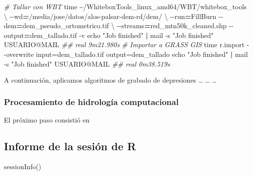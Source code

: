 \documentclass[spanish]{article}
\newenvironment{Shaded}{\begin{snugshade}}{\end{snugshade}}
\newcommand{\AttributeTok}[1]{\textcolor[rgb]{0.77,0.63,0.00}{#1}}
\newcommand{\BuiltInTok}[1]{#1}
\newcommand{\CommentTok}[1]{\textcolor[rgb]{0.56,0.35,0.01}{\textit{#1}}}
\newcommand{\DataTypeTok}[1]{\textcolor[rgb]{0.13,0.29,0.53}{#1}}
\newcommand{\ExtensionTok}[1]{#1}
\newcommand{\FunctionTok}[1]{\textcolor[rgb]{0.00,0.00,0.00}{#1}}
\newcommand{\KeywordTok}[1]{\textcolor[rgb]{0.13,0.29,0.53}{\textbf{#1}}}
\newcommand{\NormalTok}[1]{#1}
\newcommand{\OperatorTok}[1]{\textcolor[rgb]{0.81,0.36,0.00}{\textbf{#1}}}
\newcommand{\StringTok}[1]{\textcolor[rgb]{0.31,0.60,0.02}{#1}}
\begin{document}
\begin{Shaded}
\begin{Highlighting}[]
\CommentTok{\# Tallar con WBT}
\BuiltInTok{time}\NormalTok{ \textasciitilde{}/WhiteboxTools\_linux\_amd64/WBT/whitebox\_tools }\DataTypeTok{\textbackslash{}}
  \AttributeTok{{-}{-}wd}\OperatorTok{=}\StringTok{\textquotesingle{}/media/jose/datos/alos{-}palsar{-}dem{-}rd/dem/\textquotesingle{}} \DataTypeTok{\textbackslash{}}
  \AttributeTok{{-}{-}run}\OperatorTok{=}\NormalTok{FillBurn }\AttributeTok{{-}{-}dem}\OperatorTok{=}\StringTok{\textquotesingle{}dem\_pseudo\_ortometrico.tif\textquotesingle{}} \DataTypeTok{\textbackslash{}}
  \AttributeTok{{-}{-}streams}\OperatorTok{=}\NormalTok{red\_mtn50k\_cleaned.shp }\AttributeTok{{-}{-}output}\OperatorTok{=}\StringTok{\textquotesingle{}dem\_tallado.tif\textquotesingle{}} \AttributeTok{{-}v}
\BuiltInTok{echo} \StringTok{"Job finished"} \KeywordTok{|} \ExtensionTok{mail} \AttributeTok{{-}s} \StringTok{"Job finished"}\NormalTok{ USUARIO@MAIL}
\CommentTok{\#\# real 9m21.980s}
\CommentTok{\# Importar a GRASS GIS}
\BuiltInTok{time}\NormalTok{ r.import }\AttributeTok{{-}{-}overwrite}\NormalTok{ input=dem\_tallado.tif output=dem\_tallado}
\BuiltInTok{echo} \StringTok{"Job finished"} \KeywordTok{|} \ExtensionTok{mail} \AttributeTok{{-}s} \StringTok{"Job finished"}\NormalTok{ USUARIO@MAIL}
\CommentTok{\#\# real 0m38.519s}
\end{Highlighting}
\end{Shaded}

A continuación, aplicamos algoritmos de grabado de depresiones \ldots{}
\ldots{} \ldots{}

\hypertarget{procesamiento-de-hidrologuxeda-computacional-1}{%
\subsubsection{Procesamiento de hidrología
computacional}\label{procesamiento-de-hidrologuxeda-computacional-1}}

El próximo paso consistió en

\hypertarget{informe-de-la-sesiuxf3n-de-r}{%
\subsection*{Informe de la sesión de
R}\label{informe-de-la-sesiuxf3n-de-r}}

\begin{Shaded}
\begin{Highlighting}[]
\FunctionTok{sessionInfo}\NormalTok{()}
\end{Highlighting}
\end{Shaded}
\end{document}
